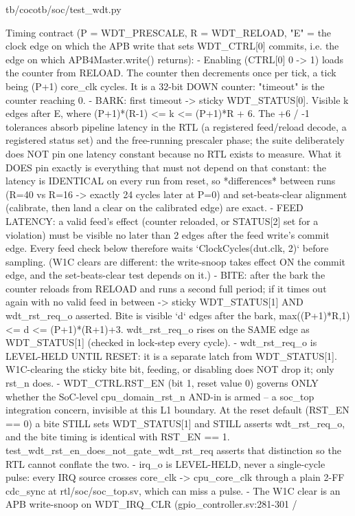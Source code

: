 \begin{relocated}{tb/cocotb/soc/test_wdt.py}
\begin{textblock}
Timing contract (P = WDT_PRESCALE, R = WDT_RELOAD, "E" = the clock edge on which the APB write
that sets WDT_CTRL[0] commits, i.e. the edge on which APB4Master.write() returns):
- Enabling (CTRL[0] 0 -> 1) loads the counter from RELOAD. The counter then decrements once per
tick, a tick being (P+1) core_clk cycles. It is a 32-bit DOWN counter: "timeout" is the
counter reaching 0.
- BARK: first timeout -> sticky WDT_STATUS[0]. Visible k edges after E, where
(P+1)*(R-1) <= k <= (P+1)*R + 6. The +6 / -1 tolerances absorb pipeline latency in the RTL
(a registered feed/reload decode, a registered status set) and the free-running prescaler
phase; the suite deliberately does NOT pin one latency constant because no RTL exists to
measure. What it DOES pin exactly is everything that must not depend on that constant:
the latency is IDENTICAL on every run from reset, so *differences* between runs
(R=40 vs R=16 -> exactly 24 cycles later at P=0) and set-beats-clear alignment (calibrate,
then land a clear on the calibrated edge) are exact.
- FEED LATENCY: a valid feed's effect (counter reloaded, or STATUS[2] set for a violation) must be
visible no later than 2 edges after the feed write's commit edge. Every feed check below
therefore waits `ClockCycles(dut.clk, 2)` before sampling. (W1C clears are different: the
write-snoop takes effect ON the commit edge, and the set-beats-clear test depends on it.)
- BITE: after the bark the counter reloads from RELOAD and runs a second full period; if it
times out again with no valid feed in between -> sticky WDT_STATUS[1] AND wdt_rst_req_o
asserted. Bite is visible `d` edges after the bark, max((P+1)*R,1) <= d <= (P+1)*(R+1)+3.
wdt_rst_req_o rises on the SAME edge as WDT_STATUS[1] (checked in lock-step every cycle).
- wdt_rst_req_o is LEVEL-HELD UNTIL RESET: it is a separate latch from WDT_STATUS[1]. W1C-clearing
the sticky bite bit, feeding, or disabling does NOT drop it; only rst_n does.
- WDT_CTRL.RST_EN (bit 1, reset value 0) governs ONLY whether the SoC-level cpu_domain_rst_n
AND-in is armed -- a soc_top integration concern, invisible at this L1 boundary. At the reset
default (RST_EN == 0) a bite STILL sets WDT_STATUS[1] and STILL asserts wdt_rst_req_o, and the
bite timing is identical with RST_EN == 1. test_wdt_rst_en_does_not_gate_wdt_rst_req asserts
that distinction so the RTL cannot conflate the two.
- irq_o is LEVEL-HELD, never a single-cycle pulse: every IRQ source crosses core_clk ->
cpu_core_clk through a plain 2-FF cdc_sync at rtl/soc/soc_top.sv, which can miss a pulse.
- The W1C clear is an APB write-snoop on WDT_IRQ_CLR (gpio_controller.sv:281-301 /

\end{textblock}
\end{relocated}
